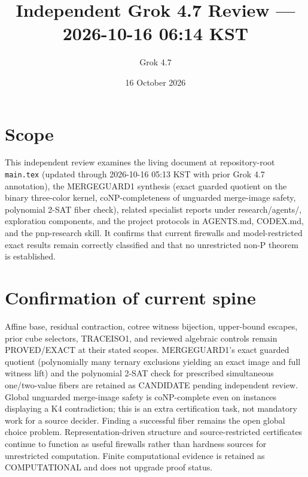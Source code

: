 \documentclass[11pt]{article}
\title{Independent Grok 4.7 Review --- 2026-10-16 06:14 KST}
\author{Grok 4.7}
\date{16 October 2026}
\begin{document}
\maketitle

\begin{center}
\end{center}

\section{Scope}
This independent review examines the living document at repository-root \texttt{main.tex} (updated through 2026-10-16 05:13 KST with prior Grok 4.7 annotation), the MERGEGUARD1 synthesis (exact guarded quotient on the binary three-color kernel, coNP-completeness of unguarded merge-image safety, polynomial 2-SAT fiber check), related specialist reports under research/agents/, exploration components, and the project protocols in AGENTS.md, CODEX.md, and the pnp-research skill. It confirms that current firewalls and model-restricted exact results remain correctly classified and that no unrestricted non-P theorem is established.

\section{Confirmation of current spine}
Affine base, residual contraction, cotree witness bijection, upper-bound escapes, prior cube selectors, TRACEISO1, and reviewed algebraic controls remain PROVED/EXACT at their stated scopes. MERGEGUARD1's exact guarded quotient (polynomially many ternary exclusions yielding an exact image and full witness lift) and the polynomial 2-SAT check for prescribed simultaneous one/two-value fibers are retained as CANDIDATE pending independent review. Global unguarded merge-image safety is coNP-complete even on instances displaying a K4 contradiction; this is an extra certification task, not mandatory work for a source decider. Finding a successful fiber remains the open global choice problem. Representation-driven structure and source-restricted certificates continue to function as useful firewalls rather than hardness sources for unrestricted computation. Finite computational evidence is retained as COMPUTATIONAL and does not upgrade proof status.
\end{document}
